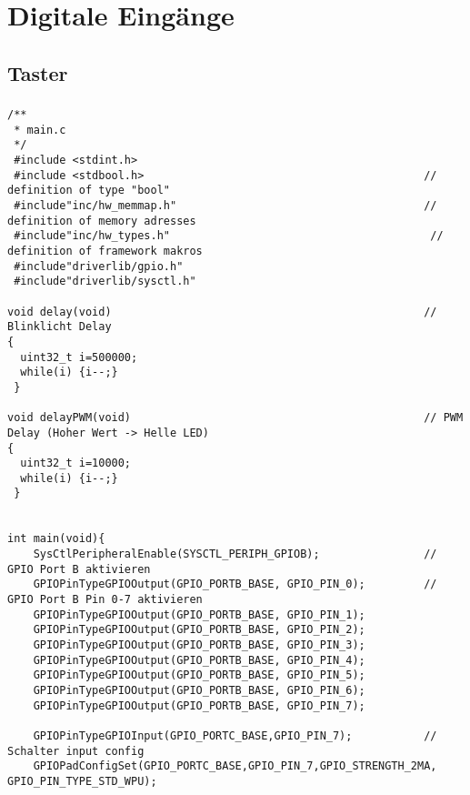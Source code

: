 \section{Digitale Eingänge}
\subsection{Taster}
\subsubsection{}
\begin{lstlisting}
/**
 * main.c
 */
 #include <stdint.h>
 #include <stdbool.h>                                           // definition of type "bool"
 #include"inc/hw_memmap.h"                                      // definition of memory adresses
 #include"inc/hw_types.h"                                        // definition of framework makros
 #include"driverlib/gpio.h"
 #include"driverlib/sysctl.h"

void delay(void)                                                // Blinklicht Delay
{
  uint32_t i=500000;
  while(i) {i--;}
 }

void delayPWM(void)                                             // PWM Delay (Hoher Wert -> Helle LED)
{
  uint32_t i=10000;
  while(i) {i--;}
 }


int main(void){
    SysCtlPeripheralEnable(SYSCTL_PERIPH_GPIOB);                // GPIO Port B aktivieren
    GPIOPinTypeGPIOOutput(GPIO_PORTB_BASE, GPIO_PIN_0);         // GPIO Port B Pin 0-7 aktivieren
    GPIOPinTypeGPIOOutput(GPIO_PORTB_BASE, GPIO_PIN_1);
    GPIOPinTypeGPIOOutput(GPIO_PORTB_BASE, GPIO_PIN_2);
    GPIOPinTypeGPIOOutput(GPIO_PORTB_BASE, GPIO_PIN_3);
    GPIOPinTypeGPIOOutput(GPIO_PORTB_BASE, GPIO_PIN_4);
    GPIOPinTypeGPIOOutput(GPIO_PORTB_BASE, GPIO_PIN_5);
    GPIOPinTypeGPIOOutput(GPIO_PORTB_BASE, GPIO_PIN_6);
    GPIOPinTypeGPIOOutput(GPIO_PORTB_BASE, GPIO_PIN_7);

    GPIOPinTypeGPIOInput(GPIO_PORTC_BASE,GPIO_PIN_7);           // Schalter input config
    GPIOPadConfigSet(GPIO_PORTC_BASE,GPIO_PIN_7,GPIO_STRENGTH_2MA, GPIO_PIN_TYPE_STD_WPU);


\end{lstlisting}
